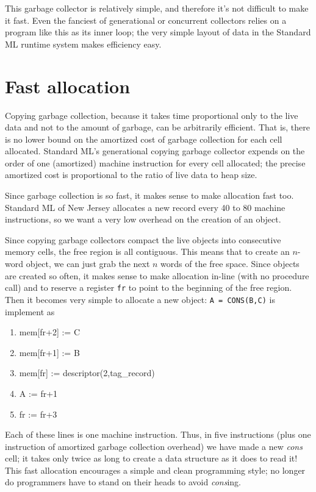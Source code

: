 This garbage collector is relatively simple, and therefore it's not difficult
to make it fast.  Even the fanciest of generational or concurrent collectors
relies on a program like this as its inner loop; the very simple layout
of data in the Standard ML runtime system makes efficiency easy.

\section{Fast allocation}
\label{fast}

Copying garbage collection, because it takes time proportional only to the
live data and not to the amount of garbage, can be arbitrarily 
efficient\cite{appel87:gc}.  That is, there is no lower bound on the
amortized cost of garbage collection for each cell allocated.
Standard ML's generational copying garbage collector\cite{appel89:sggc}
expends on the order of one (amortized)
machine instruction for every cell allocated; the precise amortized
cost is proportional to the ratio of live data to heap size.

Since garbage collection is so fast, it makes sense to make
allocation
fast too.  Standard ML of New Jersey allocates a new record every
40 to 80 machine instructions, so we want a very low overhead on the
creation of an object.

Since copying garbage collectors compact the live objects into consecutive
memory cells, the free region is all contiguous.  This means that to create
an $n$-word object, we can just grab the next $n$ words of the free space.
Since objects are created so often, it makes sense to make allocation
in-line (with no procedure call) and to reserve a register \verb"fr" to point
to the beginning of the free region.  Then it becomes very simple
to allocate a new object:  \verb"A = CONS(B,C)" is implement as
\begin{enumerate}
\item mem[fr+2] := C
\item mem[fr+1] := B
\item mem[fr]   := descriptor(2,tag\_record)
\item A := fr+1
\item fr := fr+3
\end{enumerate}
Each of these lines is one machine instruction.  Thus, in five instructions
(plus one instruction of amortized garbage collection overhead)
we have made a new {\em cons} cell; it takes only twice as long to create
a data structure as it does to read it!  
This fast allocation encourages a simple and clean programming style;
no longer do programmers have to stand on their heads to avoid {\em cons}ing.

